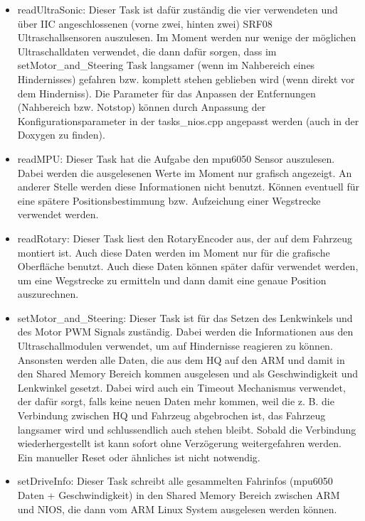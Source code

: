  \begin{itemize}
  \item readUltraSonic: Dieser Task ist dafür zuständig die vier verwendeten und über IIC angeschlossenen (vorne zwei, hinten zwei) SRF08 Ultraschallsensoren auszulesen. Im Moment werden nur wenige der möglichen Ultraschalldaten verwendet, die dann dafür sorgen, dass im setMotor\_and\_Steering Task langsamer (wenn im Nahbereich eines Hindernisses) gefahren bzw. komplett stehen geblieben wird (wenn direkt vor dem Hinderniss). Die Parameter für das Anpassen der Entfernungen (Nahbereich bzw. Notstop) können durch Anpassung der Konfigurationsparameter in der tasks\_nios.cpp angepasst werden (auch in der Doxygen zu finden).
  \item readMPU: Dieser Task hat die Aufgabe den mpu6050 Sensor auszulesen. Dabei werden die ausgelesenen Werte im Moment nur grafisch angezeigt. An anderer Stelle werden diese Informationen nicht benutzt. Können eventuell für eine spätere Positionsbestimmung bzw. Aufzeichung einer Wegstrecke verwendet werden.
  \item readRotary: Dieser Task liest den RotaryEncoder aus, der auf dem Fahrzeug montiert ist. Auch diese Daten werden im Moment nur für die grafische Oberfläche benutzt. Auch diese Daten können später dafür verwendet werden, um eine Wegstrecke zu ermitteln und dann damit eine genaue Position auszurechnen.
  \item setMotor\_and\_Steering: Dieser Task ist für das Setzen des Lenkwinkels und des Motor PWM Signals zuständig. Dabei werden die Informationen aus den Ultraschallmodulen verwendet, um auf Hindernisse reagieren zu können. Ansonsten werden alle Daten, die aus dem HQ auf den ARM und damit in den Shared Memory Bereich kommen ausgelesen und als Geschwindigkeit und Lenkwinkel gesetzt. Dabei wird auch ein Timeout Mechanismus verwendet, der dafür sorgt, falls keine neuen Daten mehr kommen, weil die z. B. die Verbindung zwischen HQ und Fahrzeug abgebrochen ist, das Fahrzeug langsamer wird und schlussendlich auch stehen bleibt. Sobald die Verbindung wiederhergestellt ist kann sofort ohne Verzögerung weitergefahren werden. Ein manueller Reset oder ähnliches ist nicht notwendig.
  \item setDriveInfo: Dieser Task schreibt alle gesammelten Fahrinfos (mpu6050 Daten + Geschwindigkeit) in den Shared Memory Bereich zwischen ARM und NIOS, die dann vom ARM Linux System ausgelesen werden können.
 \end{itemize}
